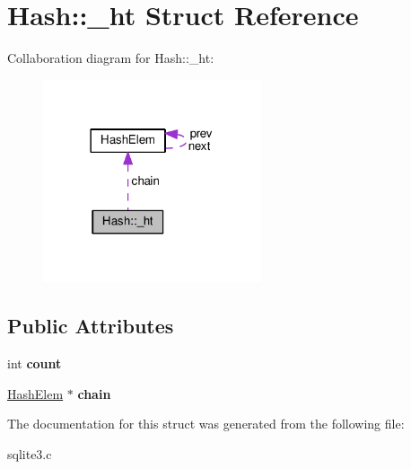 \hypertarget{structHash_1_1__ht}{}\section{Hash\+:\+:\+\_\+ht Struct Reference}
\label{structHash_1_1__ht}


Collaboration diagram for Hash\+:\+:\+\_\+ht\+:\nopagebreak
\begin{figure}[H]
\begin{center}
\leavevmode
\includegraphics[width=182pt]{structHash_1_1__ht__coll__graph}
\end{center}
\end{figure}
\subsection*{Public Attributes}
\begin{DoxyCompactItemize}
\item 
int {\bfseries count}\hypertarget{structHash_1_1__ht_a0677191178b6c7c5c6c2880f41cf24b1}{}\label{structHash_1_1__ht_a0677191178b6c7c5c6c2880f41cf24b1}

\item 
\hyperlink{structHashElem}{Hash\+Elem} $\ast$ {\bfseries chain}\hypertarget{structHash_1_1__ht_a56fc145e7d38d9440d85ab2ea63a48ac}{}\label{structHash_1_1__ht_a56fc145e7d38d9440d85ab2ea63a48ac}

\end{DoxyCompactItemize}


The documentation for this struct was generated from the following file\+:\begin{DoxyCompactItemize}
\item 
sqlite3.\+c\end{DoxyCompactItemize}
